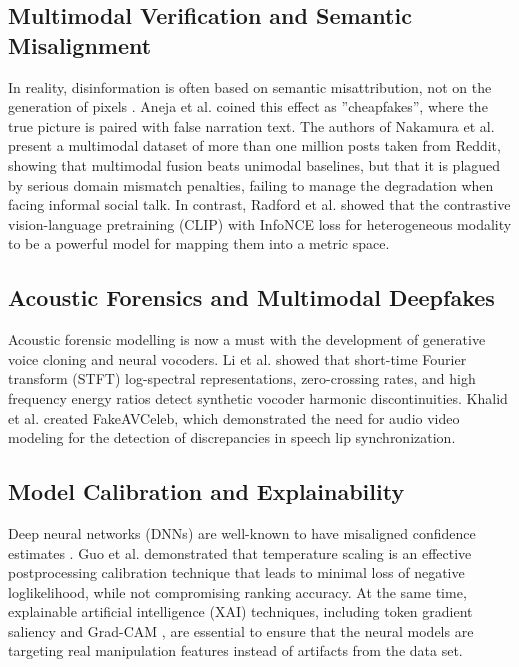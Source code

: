 \documentclass[conference]{IEEEtran}
\begin{document}
\subsection{Multimodal Verification and Semantic Misalignment}
In reality, disinformation is often based on semantic misattribution, not on the generation of pixels \cite{alam2022survey}. Aneja et al. \cite{aneja2021cosmos} coined this effect as ''cheapfakes'', where the true picture is paired with false narration text. The authors of Nakamura et al. \cite{nakamura2020fakeddit} present a multimodal dataset of more than one million posts taken from Reddit, showing that multimodal fusion beats unimodal baselines, but that it is plagued by serious domain mismatch penalties, failing to manage the degradation when facing informal social talk. In contrast, Radford et al. \cite{radford2021learning} showed that the contrastive vision-language pretraining (CLIP) with InfoNCE loss \cite{oord2018representation} for heterogeneous modality to be a powerful model for mapping them into a metric space.

\subsection{Acoustic Forensics and Multimodal Deepfakes}
Acoustic forensic modelling is now a must with the development of generative voice cloning and neural vocoders. Li et al. \cite{li2021replay} showed that short-time Fourier transform (STFT) log-spectral representations, zero-crossing rates, and high frequency energy ratios detect synthetic vocoder harmonic discontinuities. Khalid et al. \cite{khalid2021fakeavceleb} created FakeAVCeleb, which demonstrated the need for audio video modeling for the detection of discrepancies in speech lip synchronization.

\subsection{Model Calibration and Explainability}
Deep neural networks (DNNs) are well-known to have misaligned confidence estimates \cite{guo2017calibration}. Guo et al. demonstrated that temperature scaling is an effective postprocessing calibration technique that leads to minimal loss of negative loglikelihood, while not compromising ranking accuracy. At the same time, explainable artificial intelligence (XAI) techniques, including token gradient saliency \cite{sundararajan2017axiomatic} and Grad-CAM \cite{selvaraju2017gradcam}, are essential to ensure that the neural models are targeting real manipulation features instead of artifacts from the data set.
\end{document}
